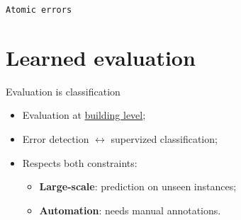 \documentclass[12pt]{beamer}
\begin{document}
\begin{frame}{\texttt{Atomic errors}}
\begin{overlayarea}{\textwidth}{.5\textheight}
{\begin{figure}[H]
{                            }
                            \caption{
                            }
                        \end{figure}
                    }
                \end{overlayarea}
            \end{frame}

    \section{Learned evaluation}
        \begin{frame}{Evaluation is classification}
            \begin{itemize}[label=$\blacktriangleright$, font=\color{IGNGreen}]
                \item<1-> Evaluation at \underline{building level};
                \item<2-> Error detection \(\leftrightarrow\) supervized classification;
                \item<3-> Respects both constraints:
                    \begin{itemize}[label=$\blacktriangleright$, font=\color{IGNGreen}]
                        \item<4-> \textbf{Large-scale}: prediction on unseen instances;
                        \item<5-> \textbf{Automation}: needs manual annotations.
                    \end{itemize}
            \end{itemize}
        \end{frame}
\end{document}
